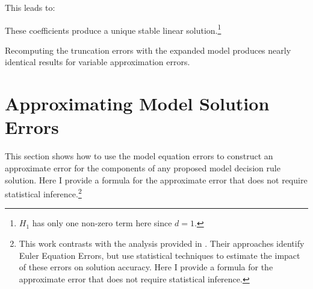 \documentclass[12pt]{article}
\begin{document}
This leads to:


These coefficients  produce a unique stable linear solution.\footnote{$H_{1}$  has only one non-zero term here since $d=1$.}

Recomputing the truncation errors with the expanded model produces nearly identical results for  variable approximation errors.


\clearpage
\section{Approximating Model Solution Errors}
\label{sec:solnerrorbounds}


This section shows how to use the model equation errors  to construct an 
approximate error for the components of any proposed
model decision rule solution.   Here I provide
a formula for the approximate error that does not require statistical inference.\footnote{This work contrasts with the analysis provided in
 \citep{judd2017lower,peralta-alva14,santos2005accuracy,Santos2000accuracy}. 
Their approaches identify Euler Equation Errors, but use statistical techniques to estimate the impact of these errors on solution accuracy.  Here I provide
a formula for the approximate error that does not require statistical inference.}
\end{document}
